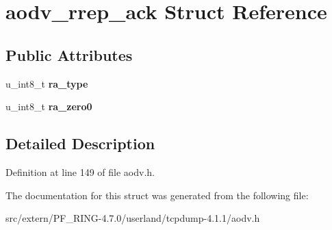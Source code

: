 \hypertarget{structaodv__rrep__ack}{
\section{aodv\_\-rrep\_\-ack Struct Reference}
\label{structaodv__rrep__ack}
}
\subsection*{Public Attributes}
\begin{DoxyCompactItemize}
\item 
\hypertarget{structaodv__rrep__ack_ab5253974ce2995ead4d8e0441ccea5d3}{
u\_\-int8\_\-t {\bfseries ra\_\-type}}
\label{structaodv__rrep__ack_ab5253974ce2995ead4d8e0441ccea5d3}

\item 
\hypertarget{structaodv__rrep__ack_ae7bf6abf6c9b80bae0eac9aac2867492}{
u\_\-int8\_\-t {\bfseries ra\_\-zero0}}
\label{structaodv__rrep__ack_ae7bf6abf6c9b80bae0eac9aac2867492}

\end{DoxyCompactItemize}


\subsection{Detailed Description}


Definition at line 149 of file aodv.h.



The documentation for this struct was generated from the following file:\begin{DoxyCompactItemize}
\item 
src/extern/PF\_\-RING-\/4.7.0/userland/tcpdump-\/4.1.1/aodv.h\end{DoxyCompactItemize}

